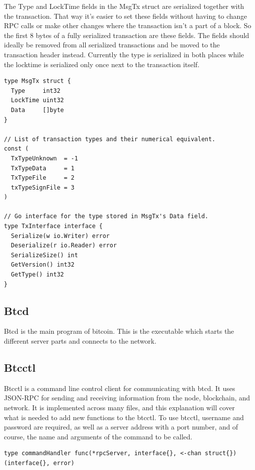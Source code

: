 \documentclass[12pt]{article}
\begin{document}
The Type and LockTime fields in the MsgTx struct are serialized together with the transaction. That way it's easier to set these fields without having to change RPC calls or make other changes where the transaction isn't a part of a block. So the first 8 bytes of a fully serialized transaction are these fields. The fields should ideally be removed from all serialized transactions and be moved to the transaction header instead. Currently the type is serialized in both places while the locktime is serialized only once next to the transaction itself.

\begin{lstlisting}[float=h!,caption={Transaction structure},label=lst:transaction_structs]
type MsgTx struct {
  Type     int32
  LockTime uint32
  Data     []byte
}

// List of transaction types and their numerical equivalent.
const (
  TxTypeUnknown  = -1
  TxTypeData     = 1
  TxTypeFile     = 2
  txTypeSignFile = 3
)

// Go interface for the type stored in MsgTx's Data field.
type TxInterface interface {
  Serialize(w io.Writer) error
  Deserialize(r io.Reader) error
  SerializeSize() int
  GetVersion() int32
  GetType() int32
}
\end{lstlisting}


\subsection{Btcd}
Btcd is the main program of bitcoin. This is the executable which starts the different server parts and connects to the network. 

\subsection{Btcctl}
Btcctl is a command line control client for communicating with btcd. It uses JSON-RPC for sending and receiving information from the node, blockchain, and network. It is implemented across many files, and this explanation will cover what is needed to add new functions to the btcctl. To use btcctl, username and password are required, as well as a server address with a port number, and of course, the name and arguments of the command to be called. 
\begin{lstlisting}[float=h!,caption={Command handler type},label=lst:cmdHandler]
type commandHandler func(*rpcServer, interface{}, <-chan struct{}) (interface{}, error)
\end{lstlisting}
\end{document}
